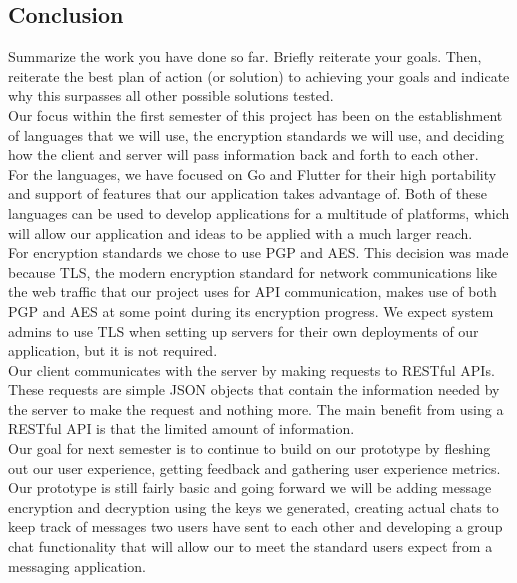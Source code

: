 \documentclass[11pt]{article}
\begin{document}
\subsection{Conclusion}
Summarize the work you have done so far.  Briefly reiterate your goals. Then, reiterate the best plan of action (or solution) to achieving your goals and indicate why this surpasses all other possible solutions tested. \\

Our focus within the first semester of this project has been on the establishment of languages that we will use, the encryption standards we will use, and deciding how the client and server will pass information back and forth to each other. \\

For the languages, we have focused on Go and Flutter for their high portability and support of features that our application takes advantage of. Both of these languages can be used to develop applications for a multitude of platforms, which will allow our application and ideas to be applied with a much larger reach. \\

For encryption standards we chose to use PGP and AES. This decision was made because TLS, the modern encryption standard for network communications like the web traffic that our project uses for API communication, makes use of both PGP and AES at some point during its encryption progress. We expect system admins to use TLS when setting up servers for their own deployments of our application, but it is not required. \\

Our client communicates with the server by making requests to RESTful APIs. These requests are simple JSON objects that contain the information needed by the server to make the request and nothing more. The main benefit from using a RESTful API is that the limited amount of information. \\

Our goal for next semester is to continue to build on our prototype by fleshing out our user experience, getting feedback and gathering user experience metrics. Our prototype is still fairly basic and going forward we will be adding message encryption and decryption using the keys we generated, creating actual chats to keep track of messages two users have sent to each other and developing a group chat functionality that will allow our to meet the standard users expect from a messaging application.
\end{document}
